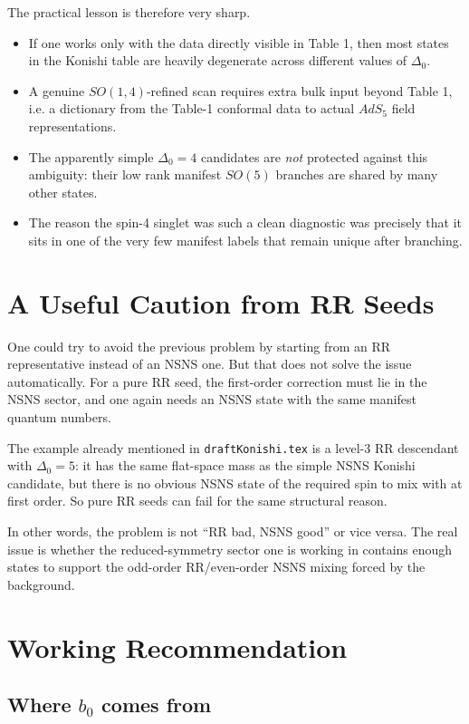 \documentclass[12pt]{article}
\newcommand{\D}{\ensuremath{\Delta}}
\begin{document}
The practical lesson is therefore very sharp.
\begin{itemize}
\item If one works only with the data directly visible in Table 1, then most states in the Konishi table are
heavily degenerate across different values of $\D_0$.
\item A genuine $SO(1,4)$-refined scan requires extra bulk input beyond Table 1, i.e. a dictionary from the
Table-1 conformal data to actual $AdS_5$ field representations.
\item The apparently simple $\D_0=4$ candidates are \emph{not} protected against this ambiguity: their low
rank manifest $SO(5)$ branches are shared by many other states.
\item The reason the spin-4 singlet was such a clean diagnostic was precisely that it sits in one of the very
few manifest labels that remain unique after branching.
\end{itemize}

\section{A Useful Caution from RR Seeds}

One could try to avoid the previous problem by starting from an RR representative instead of an NSNS one.
But that does not solve the issue automatically. For a pure RR seed, the first-order correction must lie in
the NSNS sector, and one again needs an NSNS state with the same manifest quantum numbers.

The example already mentioned in \texttt{draftKonishi.tex} is a level-3 RR descendant with $\D_0=5$:
it has the same flat-space mass as the simple NSNS Konishi candidate, but there is no obvious NSNS state
of the required spin to mix with at first order. So pure RR seeds can fail for the same structural reason.

In other words, the problem is not ``RR bad, NSNS good'' or vice versa. The real issue is whether the
reduced-symmetry sector one is working in contains enough states to support the odd-order RR/even-order NSNS
mixing forced by the background.

\section{Working Recommendation}

\subsection{Where \texorpdfstring{$b_0$}{b0} comes from}
\end{document}
